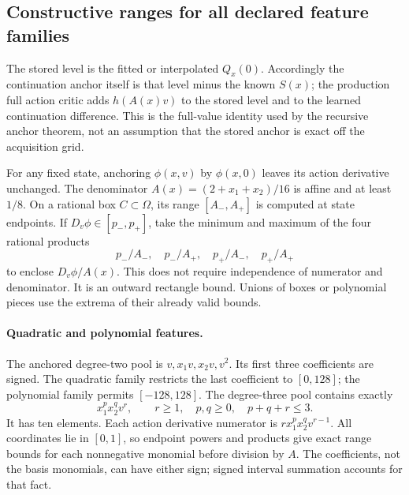 \subsection{Constructive ranges for all declared feature families}
\label{supp:featureranges121}

The stored level is the fitted or interpolated \(Q_x(0)\).
Accordingly the continuation anchor itself is that level
minus the known \(S(x)\); the production full action
critic adds \(h(A(x)v)\) to the stored level and to
the learned continuation difference.
This is the full-value identity used by the recursive
anchor theorem, not an assumption that the stored
anchor is exact off the acquisition grid.

For any fixed state, anchoring \(\phi(x,v)\) by
\(\phi(x,0)\) leaves its action derivative unchanged.
The denominator \(A(x)=(2+x_1+x_2)/16\) is affine and
at least \(1/8\).
On a rational box \(C\subset\Omega\), its range
\([A_-,A_+]\) is computed at state endpoints.
If \(D_v\phi\in[p_-,p_+]\), take the minimum and maximum
of the four rational products
\[
 p_-/A_-,\quad p_-/A_+,\quad p_+/A_-,\quad p_+/A_+
\]
to enclose \(D_v\phi/A(x)\).
This does not require independence of numerator and
denominator.  It is an outward rectangle bound.
Unions of boxes or polynomial pieces use the extrema of
their already valid bounds.

\paragraph{Quadratic and polynomial features.}
The anchored degree-two pool is
\(v,x_1v,x_2v,v^2\).
Its first three coefficients are signed.  The quadratic
family restricts the last coefficient to \([0,128]\);
the polynomial family permits \([-128,128]\).
The degree-three pool contains exactly
\[
 x_1^p x_2^q v^r,\qquad
 r\geq1,\quad p,q\geq0,\quad p+q+r\leq3.
\]
It has ten elements.  Each action derivative numerator is
\(r x_1^p x_2^qv^{r-1}\).
All coordinates lie in \([0,1]\), so endpoint powers and
products give exact range bounds for each nonnegative
monomial before division by \(A\).
The coefficients, not the basis monomials, can have either
sign; signed interval summation accounts for that fact.

